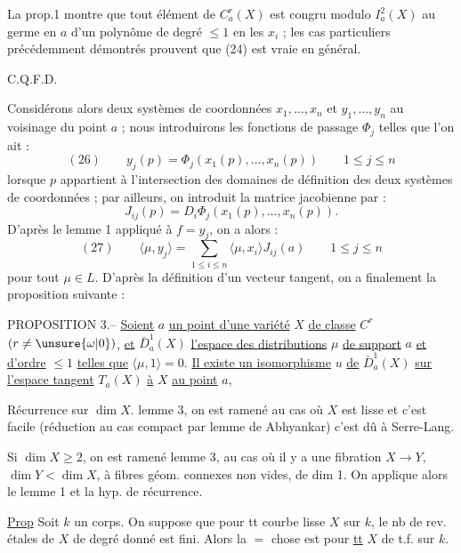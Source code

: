 La prop.1 montre que tout élément de $C_a^r(X)$ est congru modulo $I_a^2(X)$ au germe en $a$ d'un polynôme de degré $\leq1$ en les $x_i$ ; les cas particuliers précédemment démontrés prouvent que (24) est vraie en général.
\begin{flushright}C.Q.F.D.\end{flushright}

Considérons alors deux systèmes de coordonnées $x_1,\ldots,x_n$ et $y_1,\ldots,y_n$ au voisinage du point $a$ ; nous introduirons les fonctions de passage $\Phi_j$ telles que l'on ait :
\[
(26)\qquad y_j(p)=\Phi_j(x_1(p),\ldots,x_n(p))
\qquad 1\leq j\leq n
\]
lorsque $p$ appartient à l'intersection des domaines de définition des deux systèmes de coordonnées ; par ailleurs, on introduit la matrice jacobienne par :
\[
J_{ij}(p)=D_i\Phi_j(x_1(p),\ldots,x_n(p)).
\]
D'après le lemme 1 appliqué à $f=y_j$, on a alors :
\[
(27)\qquad
\langle\mu,y_j\rangle=\sum_{1\leq i\leq n}\langle\mu,x_i\rangle J_{ij}(a)
\qquad 1\leq j\leq n
\]
pour tout $\mu\in L$. D'après la définition d'un vecteur tangent, on a finalement la proposition suivante :

PROPOSITION 3.-- \uline{Soient} $a$ \uline{un point d'une variété} $X$ \uline{de classe} $C^r$ $(r\neq\unsure{\omega|0})$, \uline{et} $\bar D_a^1(X)$ \uline{l'espace des distributions} $\mu$ \uline{de support} $a$ \uline{et d'ordre} $\leq1$ \uline{telles que} $\langle\mu,1\rangle=0$.
\uline{Il existe un isomorphisme} $u$ \uline{de} $\bar D_a^1(X)$ \uline{sur l'espace tangent} $T_a(X)$ \uline{à} $X$ \uline{au point} $a$,

Récurrence sur $\dim X$.
lemme 3, on est ramené au cas où $X$ est lisse et
c'est facile (réduction au cas compact par lemme de Abhyankar)
c'est dû à Serre-Lang.

Si $\dim X\geq2$, on est ramené 
lemme 3, au cas où il y a une fibration  $X\to Y$, $\dim Y<\dim X$, 
 à fibres géom. connexes non vides, de dim 1.
On applique alors le lemme 1 et la hyp. de récurrence.

\uline{Prop} Soit $k$ un corps. On suppose que pour tt 
courbe  lisse $X$ sur $k$, le nb de rev. étales de $X$ de degré donné est fini.
Alors la $=$ chose est  pour \uline{tt} $X$ de t.f. sur $k$.

